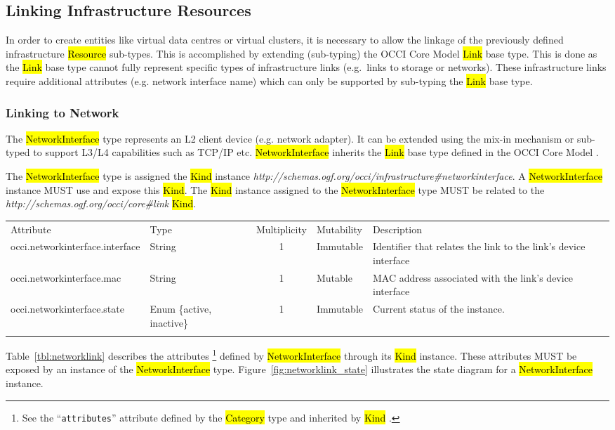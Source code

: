 \documentclass[10pt,a4paper]{article}
\begin{document}
\subsection{Linking Infrastructure Resources}
In order to create entities like virtual data centres or virtual clusters, it is necessary to allow the linkage
of the previously defined infrastructure \hl{Resource} sub-types. This is accomplished by extending 
(sub-typing) the OCCI Core Model \hl{Link} base type. This is done as the \hl{Link} base type cannot 
fully represent specific types of infrastructure links (e.g.~links to storage or networks).
These infrastructure links require additional attributes (e.g.  network
interface name) which can only be supported by sub-typing the \hl{Link} base
type.

\subsubsection{Linking to Network}
The \hl{NetworkInterface} type  represents an L2 client device (e.g. network
adapter). It can be extended using the mix-in mechanism or sub-typed to support
L3/L4 capabilities such as TCP/IP etc. 
%
\hl{NetworkInterface} inherits the \hl{Link} base type defined in the OCCI Core Model \cite{occi:core}.

The \hl{NetworkInterface} type is assigned the \hl{Kind} instance
\textit{http://schemas.ogf.org/occi/infrastructure\#networkinterface}.
A \hl{NetworkInterface} instance MUST use and expose this \hl{Kind}. 
%
The \hl{Kind} instance assigned to the \hl{NetworkInterface} type MUST be
related to the \textit{http://schemas.ogf.org/occi/core\#link} \hl{Kind}.

{
	\begin{tabular}{lp{1.8cm}clp{5cm}}
	\toprule
	Attribute&Type&Multi\-plicity&Mutability&Description\\
	\colrule
	occi.networkinterface.interface & String & 1 & Immutable 
	& Identifier that relates the link to the link's device interface\\
	occi.networkinterface.mac & String & 1 & Mutable 
	& MAC address associated with the link's device interface\\
	occi.networkinterface.state & Enum \{active, inactive\}& 1 
	& Immutable & Current status of the instance.\\
	\botrule
	\end{tabular}
}
Table~\ref{tbl:networklink} describes the attributes%
\footnote{See the ``{\tt attributes}'' attribute defined by the \hl{Category}
type and inherited by \hl{Kind} \cite{occi:core}.} 
defined by \hl{NetworkInterface} through its \hl{Kind} instance. These attributes
MUST be exposed by an instance of the \hl{NetworkInterface} type. 
Figure~\ref{fig:networklink_state} illustrates the state diagram for a \hl{NetworkInterface} instance.
\end{document}

